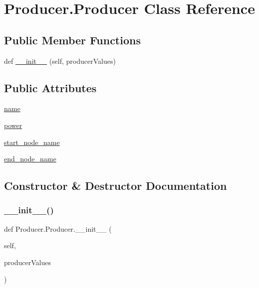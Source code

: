 \hypertarget{class_producer_1_1_producer}{}\section{Producer.\+Producer Class Reference}
\label{class_producer_1_1_producer}
\subsection*{Public Member Functions}
\begin{DoxyCompactItemize}
\item 
def \hyperlink{class_producer_1_1_producer_a539019a9459d608c34054052cc95e968}{\+\_\+\+\_\+init\+\_\+\+\_\+} (self, producer\+Values)
\end{DoxyCompactItemize}
\subsection*{Public Attributes}
\begin{DoxyCompactItemize}
\item 
\hyperlink{class_producer_1_1_producer_ad67f942ec31acad8c3ce847c70303830}{name}
\item 
\hyperlink{class_producer_1_1_producer_aab72b0ca4a83c49bb24847a3c11ff990}{power}
\item 
\hyperlink{class_producer_1_1_producer_ac2dfdc8e4a892cf9ada2722051190045}{start\+\_\+node\+\_\+name}
\item 
\hyperlink{class_producer_1_1_producer_ad58b32a20ff969543efeb26ab92cc0c8}{end\+\_\+node\+\_\+name}
\end{DoxyCompactItemize}


\subsection{Constructor \& Destructor Documentation}
\mbox{\label{class_producer_1_1_producer_a539019a9459d608c34054052cc95e968}} 
\subsubsection{\texorpdfstring{\+\_\+\+\_\+init\+\_\+\+\_\+()}{\_\_init\_\_()}}
{\footnotesize\ttfamily def Producer.\+Producer.\+\_\+\+\_\+init\+\_\+\+\_\+ (\begin{DoxyParamCaption}\item[{}]{self,  }\item[{}]{producer\+Values }\end{DoxyParamCaption})}



